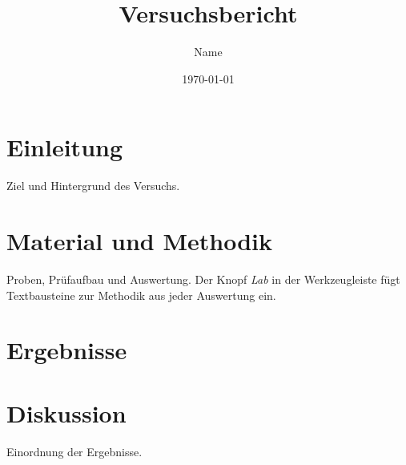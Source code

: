 \documentclass[11pt,a4paper]{article}
\title{Versuchsbericht}
\author{Name}
\date{\today}
\begin{document}
\maketitle

\section{Einleitung}
Ziel und Hintergrund des Versuchs.

\section{Material und Methodik}
Proben, Prüfaufbau und Auswertung. Der Knopf \emph{Lab} in der Werkzeugleiste fügt
Textbausteine zur Methodik aus jeder Auswertung ein.

\section{Ergebnisse}

\section{Diskussion}
Einordnung der Ergebnisse.

\printbibliography
\end{document}
